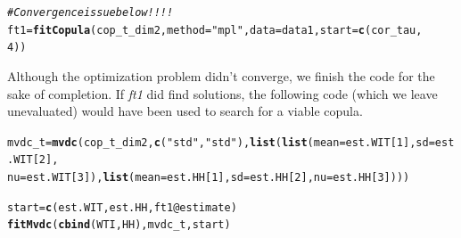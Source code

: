 \documentclass[10pt]{article}\usepackage[]{graphicx}\usepackage[]{color}
\makeatletter
\newcommand{\hlnum}[1]{\textcolor[rgb]{0.686,0.059,0.569}{#1}}%
\newcommand{\hlstr}[1]{\textcolor[rgb]{0.192,0.494,0.8}{#1}}%
\newcommand{\hlcom}[1]{\textcolor[rgb]{0.678,0.584,0.686}{\textit{#1}}}%
\newcommand{\hlopt}[1]{\textcolor[rgb]{0,0,0}{#1}}%
\newcommand{\hlstd}[1]{\textcolor[rgb]{0.345,0.345,0.345}{#1}}%
\newcommand{\hlkwb}[1]{\textcolor[rgb]{0.69,0.353,0.396}{#1}}%
\newcommand{\hlkwc}[1]{\textcolor[rgb]{0.333,0.667,0.333}{#1}}%
\newcommand{\hlkwd}[1]{\textcolor[rgb]{0.737,0.353,0.396}{\textbf{#1}}}%
\newenvironment{kframe}{%
 \def\at@end@of@kframe{}%
 \ifinner\ifhmode%
  \def\at@end@of@kframe{\end{minipage}}%
  \begin{minipage}{\columnwidth}%
 \fi\fi%
 \def\FrameCommand##1{\hskip\@totalleftmargin \hskip-\fboxsep
 \colorbox{shadecolor}{##1}\hskip-\fboxsep
     \hskip-\linewidth \hskip-\@totalleftmargin \hskip\columnwidth}%
 \MakeFramed {\advance\hsize-\width
   \@totalleftmargin\z@ \linewidth\hsize
   \@setminipage}}%
 {\par\unskip\endMakeFramed%
 \at@end@of@kframe}
\newenvironment{knitrout}{}{} %
\makeatother
\begin{document}
\begin{knitrout}
\color{fgcolor}\begin{kframe}
\begin{alltt}
\hlcom{# Convergence issue below!!!!}
\hlstd{ft1} \hlkwb{=} \hlkwd{fitCopula}\hlstd{(cop_t_dim2,} \hlkwc{method} \hlstd{=} \hlstr{"mpl"}\hlstd{,} \hlkwc{data} \hlstd{= data1,} \hlkwc{start} \hlstd{=} \hlkwd{c}\hlstd{(cor_tau,}
    \hlnum{4}\hlstd{))}
\end{alltt}


{\ttfamily\noindent\color{warningcolor}{\#\# Warning: possible convergence problem: optim() gave code=1}}\end{kframe}
\end{knitrout}

Although the optimization problem didn't converge, we finish the code for the sake of completion. If \textit{ft1} did find solutions, the following code (which we leave unevaluated) would have been used to search for a viable copula.
\begin{knitrout}
\color{fgcolor}\begin{kframe}
\begin{alltt}
\hlstd{mvdc_t} \hlkwb{=} \hlkwd{mvdc}\hlstd{(cop_t_dim2,} \hlkwd{c}\hlstd{(}\hlstr{"std"}\hlstd{,} \hlstr{"std"}\hlstd{),} \hlkwd{list}\hlstd{(}\hlkwd{list}\hlstd{(}\hlkwc{mean} \hlstd{= est.WIT[}\hlnum{1}\hlstd{],} \hlkwc{sd} \hlstd{= est.WIT[}\hlnum{2}\hlstd{],}
    \hlkwc{nu} \hlstd{= est.WIT[}\hlnum{3}\hlstd{]),} \hlkwd{list}\hlstd{(}\hlkwc{mean} \hlstd{= est.HH[}\hlnum{1}\hlstd{],} \hlkwc{sd} \hlstd{= est.HH[}\hlnum{2}\hlstd{],} \hlkwc{nu} \hlstd{= est.HH[}\hlnum{3}\hlstd{])))}

\hlstd{start} \hlkwb{=} \hlkwd{c}\hlstd{(est.WIT, est.HH, ft1}\hlopt{@}\hlkwc{estimate}\hlstd{)}
\hlkwd{fitMvdc}\hlstd{(}\hlkwd{cbind}\hlstd{(WTI, HH), mvdc_t, start)}
\end{alltt}
\end{kframe}
\end{knitrout}
\end{document}

